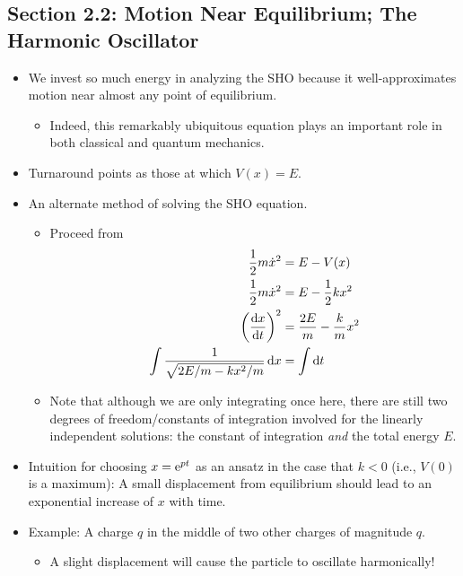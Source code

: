 \documentclass[../notes.tex]{subfiles}
\begin{document}
\subsection*{Section 2.2: Motion Near Equilibrium; The Harmonic Oscillator}
\begin{itemize}
    \item We invest so much energy in analyzing the SHO because it well-approximates motion near almost any point of equilibrium.
    \begin{itemize}
        \item Indeed, this remarkably ubiquitous equation plays an important role in both classical and quantum mechanics.
    \end{itemize}
    \item Turnaround points as those at which $V(x)=E$.
    \item An alternate method of solving the SHO equation.
    \begin{itemize}
        \item Proceed from
        \begin{align*}
            \frac{1}{2}m\dot{x}^2 &= E-V(x)\\
            \frac{1}{2}m\dot{x}^2 &= E-\frac{1}{2}kx^2\\
            \left( \dv{x}{t} \right)^2 &= \frac{2E}{m}-\frac{k}{m}x^2\\
            \int\frac{1}{\sqrt{2E/m-kx^2/m}}\dd{x} &= \int\dd{t}
        \end{align*}
        \item Note that although we are only integrating once here, there are still two degrees of freedom/constants of integration involved for the linearly independent solutions: the constant of integration \emph{and} the total energy $E$.
    \end{itemize}
    \item Intuition for choosing $x=\e[pt]$ as an ansatz in the case that $k<0$ (i.e., $V(0)$ is a maximum): A small displacement from equilibrium should lead to an exponential increase of $x$ with time.
    \item Example: A charge $q$ in the middle of two other charges of magnitude $q$.
    \begin{itemize}
        \item A slight displacement will cause the particle to oscillate harmonically!
    \end{itemize}
\end{itemize}
\end{document}
